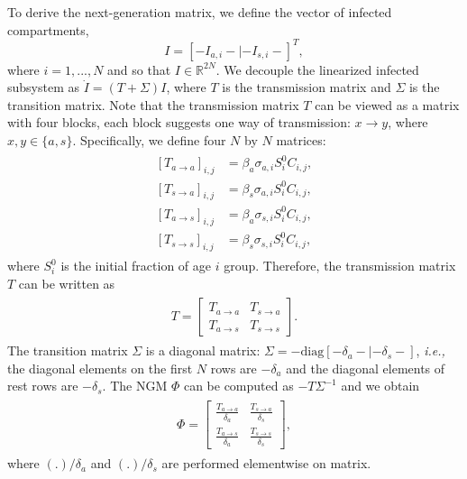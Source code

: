 \documentclass[a4paper,12pt]{article}
\begin{document}
To derive the next-generation matrix, we define the vector of infected compartments, 
\begin{displaymath}
	I = \left[ - I_{a,i} - |  - I_{s,i} - \right]^{T},
\end{displaymath}
where $i = 1,...,N$ and so that $I \in \mathbb{R}^{2N}$.  We decouple the linearized infected subsystem as $\dot{I} = (T + \Sigma)I$, where $T$ is the transmission matrix and $\Sigma$ is the transition matrix. Note that the transmission matrix $T$ can be viewed as a matrix with four blocks, each block suggests one way of transmission: $x \rightarrow y$, where $x, y \in \{a, s\}$. Specifically, we define four $N$ by $N$ matrices:
\begin{align}\label{eq: 4 blocks in age-dependent NGM}
\begin{split}
[T_{a \rightarrow a}]_{i,j} &= \beta_{a}\sigma_{a, i}S_{i}^{0}C_{i,j},\\
[T_{s \rightarrow a}]_{i,j} &= \beta_{s}\sigma_{a, i}S_{i}^{0}C_{i,j},\\
[T_{a \rightarrow s}]_{i,j} &= \beta_{a}\sigma_{s, i}S_{i}^{0}C_{i,j},\\
[T_{s \rightarrow s}]_{i,j} &= \beta_{s}\sigma_{s, i}S_{i}^{0}C_{i,j},
\end{split}
\end{align}
where $S_{i}^{0}$ is the initial fraction of age $i$ group. Therefore, the transmission matrix $T$ can be written as
\begin{align}\label{eq: T-age-dependent}
\begin{split}
T= \begin{bmatrix} T_{a \rightarrow a}&
T_{s \rightarrow a}\\
T_{a \rightarrow s}&
T_{s \rightarrow s}
\end{bmatrix}.
\end{split}
\end{align}
The transition matrix $\Sigma$ is a diagonal matrix: $\Sigma = - \text{diag}[ - \delta_{a} - | - \delta_{s} -]$, \emph{i.e.,} the diagonal elements on the first $N$ rows are $-\delta_{a}$ and the diagonal elements of rest rows are $-\delta_{s}$.  The NGM $\Phi$ can be computed as $-T\Sigma^{-1}$ and we obtain
\begin{align}\label{eq: Phi-age-dependent}
\begin{split}
\Phi= \begin{bmatrix} \frac{T_{a \rightarrow a}}{\delta_{a}}&
\frac{T_{s \rightarrow a}}{\delta_{s}}\\
\frac{T_{a \rightarrow s}}{\delta_{a}}&
\frac{T_{s \rightarrow s}}{\delta_{s}}
\end{bmatrix},
\end{split}
\end{align}
where $(.)/\delta_{a}$ and $(.)/\delta_{s}$ are performed elementwise on matrix.  
 


\clearpage

\end{document}
